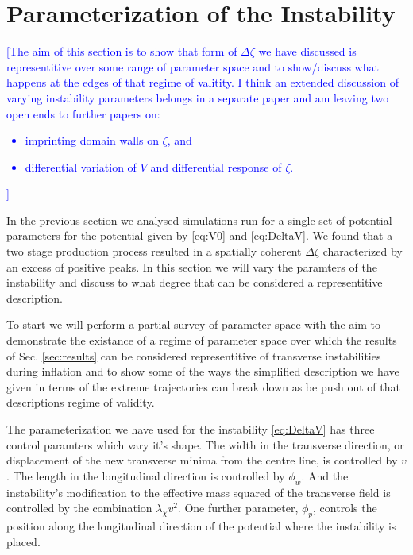 
\section{Parameterization of the Instability} \label{sec:params}
%
%
%

\textcolor{blue}{[The aim of this section is to show that form of $\Delta\zeta$ we have discussed is representitive over some range of parameter space and to show/discuss what happens at the edges of that regime of valitity. I think an extended discussion of varying instability parameters belongs in a separate paper and am leaving two open ends to further papers on:
\begin{itemize}
  \item imprinting domain walls on $\zeta$, and
  \item differential variation of $V$ and differential response of $\zeta$.
\end{itemize}
]}

In the previous section we analysed simulations run for a single set of potential parameters for the potential given by \eqref{eq:V0} and \eqref{eq:DeltaV}. We found that a two stage production process resulted in a spatially coherent $\Delta\zeta$ characterized by an excess of positive peaks. In this section we will vary the paramters of the instability and discuss to what degree that can be considered a representitive description.

To start we will perform a partial survey of parameter space with the aim to demonstrate the existance of a regime of parameter space over which the results of Sec. \ref{sec:results} can be considered representitive of transverse instabilities during inflation and to show some of the ways the simplified description we have given in terms of the extreme trajectories can break down as be push out of that descriptions regime of validity.

The parameterization we have used for the instability \eqref{eq:DeltaV} has three control paramters which vary it's shape. The width in the transverse direction, or displacement of the new transverse minima from the centre line, is controlled by $v$. The length in the longitudinal direction is controlled by $\phi_w$. And the instability's modification to the effective mass squared of the transverse field is controlled by the combination $\lambda_\chi v^2$. One further parameter, $\phi_p$, controls the position along the longitudinal direction of the potential where the instability is placed.

